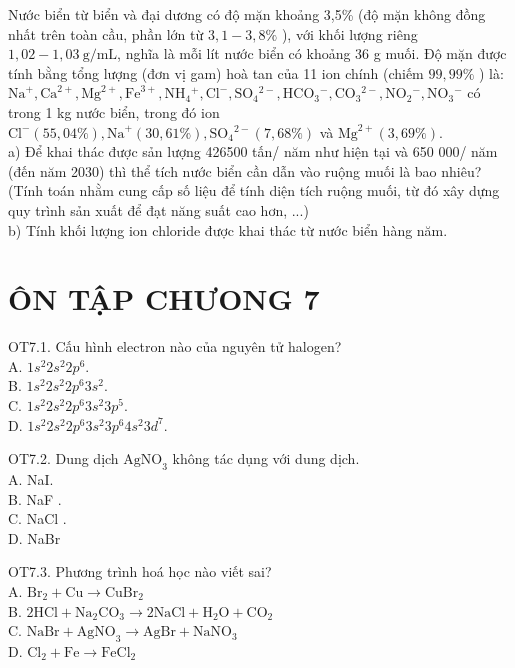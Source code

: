 \documentclass[10pt]{article}
\begin{document}
Nước biển từ biển và đại dương có độ mặn khoảng 3,5\% (độ mặn không đồng nhất trên toàn cầu, phần lớn từ $3,1-3,8 \%$ ), với khối lượng riêng $1,02-1,03 \mathrm{~g} / \mathrm{mL}$, nghĩa là mỗi lít nước biển có khoảng 36 g muối. Độ mặn được tính bằng tổng lượng (đơn vị gam) hoà tan của 11 ion chính (chiếm $99,99 \%$ ) là: $\mathrm{Na}^{+}, \mathrm{Ca}^{2+}, \mathrm{Mg}^{2+}, \mathrm{Fe}^{3+}, \mathrm{NH}_{4}{ }^{+}, \mathrm{Cl}^{-}, \mathrm{SO}_{4}{ }^{2-}, \mathrm{HCO}_{3}{ }^{-}, \mathrm{CO}_{3}{ }^{2-}, \mathrm{NO}_{2}{ }^{-}, \mathrm{NO}_{3}{ }^{-}$ có trong 1 kg nước biển, trong đó ion $\mathrm{Cl}^{-}(55,04 \%), \mathrm{Na}^{+}(30,61 \%), \mathrm{SO}_{4}{ }^{2-} (7,68 \%)$ và $\mathrm{Mg}^{2+}(3,69 \%)$.\\
a) Để khai thác được sản lượng 426500 tấn/ năm như hiện tại và 650 000/ năm (đến năm 2030) thì thể tích nước biển cần dẫn vào ruộng muối là bao nhiêu? (Tính toán nhằm cung cấp số liệu để tính diện tích ruộng muối, từ đó xây dựng quy trình sản xuất để đạt năng suất cao hơn, ...)\\
b) Tính khối lượng ion chloride được khai thác từ nước biển hàng năm.

\section*{ÔN TẬP CHƯONG 7}
OT7.1. Cấu hình electron nào của nguyên tử halogen?\\
A. $1 s^{2} 2 s^{2} 2 p^{6}$.\\
B. $1 s^{2} 2 s^{2} 2 p^{6} 3 s^{2}$.\\
C. $1 s^{2} 2 s^{2} 2 p^{6} 3 s^{2} 3 p^{5}$.\\
D. $1 s^{2} 2 s^{2} 2 p^{6} 3 s^{2} 3 p^{6} 4 s^{2} 3 d^{7}$.

OT7.2. Dung dịch $\mathrm{AgNO}_{3}$ không tác dụng với dung dịch.\\
A. NaI.\\
B. NaF .\\
C. NaCl .\\
D. NaBr

OT7.3. Phương trình hoá học nào viết sai?\\
A. $\mathrm{Br}_{2}+\mathrm{Cu} \rightarrow \mathrm{CuBr}_{2}$\\
B. $2 \mathrm{HCl}+\mathrm{Na}_{2} \mathrm{CO}_{3} \rightarrow 2 \mathrm{NaCl}+\mathrm{H}_{2} \mathrm{O}+\mathrm{CO}_{2}$\\
C. $\mathrm{NaBr}+\mathrm{AgNO}_{3} \rightarrow \mathrm{AgBr}+\mathrm{NaNO}_{3}$\\
D. $\mathrm{Cl}_{2}+\mathrm{Fe} \rightarrow \mathrm{FeCl}_{2}$
\end{document}

